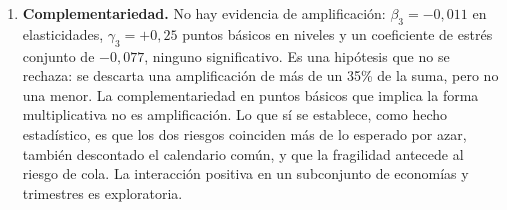 \begin{enumerate}
    \item \textbf{Complementariedad.} No hay evidencia de amplificación: $\beta_3=-0{,}011$ en elasticidades, $\gamma_3=+0{,}25$ puntos básicos en niveles y un coeficiente de estrés conjunto de $-0{,}077$, ninguno significativo. Es una hipótesis que no se rechaza: se descarta una amplificación de más de un 35\% de la suma, pero no una menor. La complementariedad en puntos básicos que implica la forma multiplicativa no es amplificación. Lo que sí se establece, como hecho estadístico, es que los dos riesgos coinciden más de lo esperado por azar, también descontado el calendario común, y que la fragilidad antecede al riesgo de cola. La interacción positiva en un subconjunto de economías y trimestres es exploratoria.
\end{enumerate}
